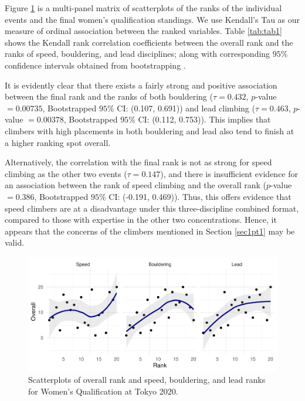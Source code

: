 \documentclass[letterpaper, inpress]{jds} %
\begin{document}
Figure \ref{fig:fig4} is a multi-panel matrix of scatterplots of the
ranks of the individual events and the final women's qualification
standings. We use Kendall's Tau \citep{kendall1938} as our measure of
ordinal association between the ranked variables. Table \ref{tab:tab1}
shows the Kendall rank correlation coefficients between the overall rank
and the ranks of speed, bouldering, and lead disciplines; along with
corresponding \(95\%\) confidence intervals obtained from bootstrapping \citep{efron1986}.

It is evidently clear that there exists a fairly strong and positive
association between the final rank and the ranks of both bouldering
(\(\tau = 0.432\), \(p\)-value \(=0.00735\), Bootstrapped \(95\%\) CI:
(0.107, 0.691)) and lead climbing (\(\tau = 0.463\), \(p\)-value
\(=0.00378\), Bootstrapped \(95\%\) CI: (0.112, 0.753)). This implies
that climbers with high placements in both bouldering and lead also tend
to finish at a higher ranking spot overall.

Alternatively, the correlation with the final rank is not as strong for
speed climbing as the other two events (\(\tau = 0.147\)), and there is
insufficient evidence for an association between the rank of speed
climbing and the overall rank (\(p\)-value \(=0.386\), Bootstrapped
\(95\%\) CI: (-0.191, 0.469)). Thus, this offers evidence that speed
climbers are at a disadvantage under this three-discipline combined
format, compared to those with expertise in the other two
concentrations. Hence, it appears that the concerns of the climbers
mentioned in Section \ref{sec1pt1} may be valid.

\begin{figure}
\centering
\includegraphics[width=0.9\linewidth]{scatter-1.pdf}
\caption{\label{fig:fig4}Scatterplots of overall rank and speed,
bouldering, and lead ranks for Women's Qualification at Tokyo 2020.}
\end{figure}
\end{document}
